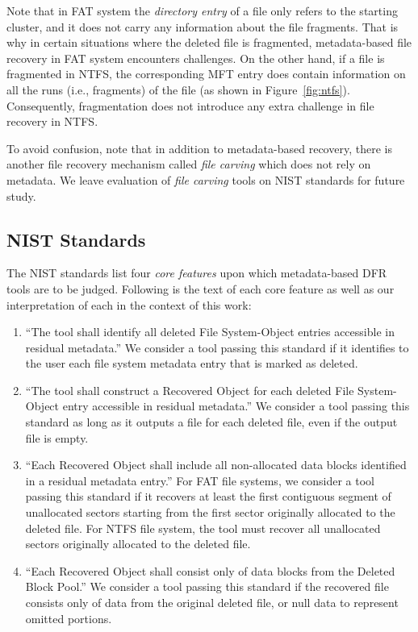 Note that in FAT system the \emph{directory entry} of a file only refers to the starting cluster, and it does not carry any information about the file fragments.
That is why in certain situations where the deleted file is fragmented, metadata-based file recovery in FAT system encounters challenges.
On the other hand, if a file is fragmented in NTFS, the corresponding MFT entry does contain information on all the runs (i.e., fragments) of the file
(as shown in Figure~\ref{fig:ntfs}). Consequently, fragmentation does not introduce any extra challenge in file recovery in NTFS.

To avoid confusion, note that in addition to metadata-based recovery, there is another file recovery mechanism called \emph{file carving} which does not  
rely on metadata. We leave evaluation of \emph{file carving} tools on NIST standards for future study. 

\subsection{NIST Standards}
The NIST standards list four \emph{core features} upon which metadata-based DFR tools are to be judged.
Following is the text of each core feature as well as our interpretation of each in the context of this work:
\begin{enumerate}
 \item ``The tool shall identify all deleted File System-Object entries accessible in residual metadata.''\cite{meta:dfr:standards}
 We consider a tool passing this standard if it identifies to the user each file system metadata entry that is marked as deleted.
 \item ``The tool shall construct a Recovered Object for each deleted File System-Object entry accessible in residual metadata.''\cite{meta:dfr:standards}
 We consider a tool passing this standard as long as it outputs a file for each deleted file, even if the output file is empty.
 \item ``Each Recovered Object shall include all non-allocated data blocks identified in a residual metadata entry.''\cite{meta:dfr:standards}
 For FAT file systems, we consider a tool passing this standard if it recovers at least the first contiguous segment of unallocated sectors starting from the first sector originally allocated to the deleted file. For NTFS file system, the tool must recover all unallocated sectors originally allocated to the deleted file.
 \item ``Each Recovered Object shall consist only of data blocks from the Deleted Block Pool.''\cite{meta:dfr:standards}
 We consider a tool passing this standard if the recovered file consists only of data from the original deleted file, or null data to represent omitted portions.
\end{enumerate}



